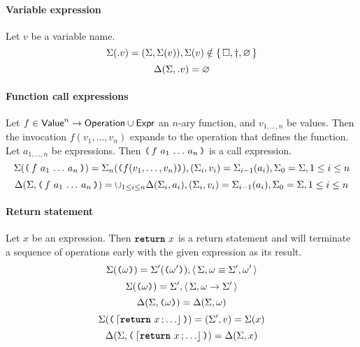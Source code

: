 \paragraph{Variable expression}
Let $v$ be a variable name.
$$
\Sigma({.}v) = (\Sigma, \Sigma(v)),
	\Sigma(v) \notin \left\{\,\Box, \dagger, \varnothing\,\right\}
$$
$$
\Delta(\Sigma, {.}v) = \varnothing
$$

\paragraph{Function call expressions}
Let $f \in \mathsf{Value}^n \to \mathsf{Operation} \cup \mathsf{Expr}$ an $n$-ary function, and $v_{1, \ldots, n}$ be values.
Then the invocation $f(v_1, \ldots, v_n)$ expands to the operation that defines the function.
Let $a_{1, \ldots, n}$ be expressions.
Then $\opexp{f}{a_1}{\ldots}{a_n}$ is a call expression.
$$
\Sigma(\opexp{f}{a_1}{\ldots}{a_n}) = \Sigma_n(\ttlparen f(v_1, \ldots, v_n) \ttrparen),
	(\Sigma_i, v_i) = \Sigma_{i-1}(a_i),
		\Sigma_0 = \Sigma, 1 \le i \le n
$$
$$
\Delta(\Sigma, \opexp{f}{a_1}{\ldots}{a_n}) =
		\cup_{1 \le i \le n} \Delta(\Sigma_i, a_i),
	(\Sigma_i, v_i) = \Sigma_{i-1}(a_i),
		\Sigma_0 = \Sigma, 1 \le i \le n
$$

\paragraph{Return statement}
Let $x$ be an expression.
Then $\texttt{\textbf{return}}~x$ is a return statement and will terminate a sequence of operations early with the given expression as its result.
$$
\Sigma(\texttt{(} \omega \texttt{)}) = \Sigma'(\texttt{(} \omega' \texttt{)}),
	\left\langle\, \Sigma, \omega \equiv \Sigma', \omega' \,\right\rangle
$$
$$
\Sigma(\texttt{(} \omega \texttt{)}) = \Sigma',
	\left\langle\, \Sigma, \omega \to \Sigma' \,\right\rangle
$$
$$
\Delta(\Sigma, \texttt{(} \omega \texttt{)}) = \Delta(\Sigma, \omega)
$$
$$
\Sigma(\ttlparen \stmt{\retstmt{x}}{\ldots} \ttrparen) = (\Sigma', v) = \Sigma(x)
$$
$$
\Delta(\Sigma, \ttlparen \stmt{\retstmt{x}}{\ldots} \ttrparen) = \Delta(\Sigma, x)
$$